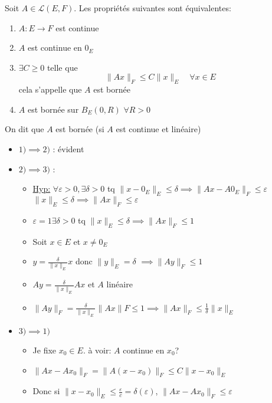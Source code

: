 \begin{theorem}
    Soit $A \in \mathcal{L}(E, F)$. Les propriétés suivantes sont équivalentes:
    \begin{enumerate}
        \item $A: E \to F$ est continue
        \item $A$ est continue en  $0_E$
        \item  $\exists C \ge 0$ telle que 
            \[
            \|Ax\|_F \le C\|x\|_E \quad \forall x \in E
            \] 
            cela s'appelle que $A$ est bornée
        \item $A$ est bornée sur  $B_E(0, R)$ $\forall R > 0$
    \end{enumerate}
    On dit que $A$ est bornée (si $A$ est continue et linéaire)
\end{theorem}
\begin{preuve}
    \begin{itemize}
        \item $1) \implies 2)$ : évident
        \item $2) \implies 3)$ : 
            \begin{itemize}
                \item 
                    \underline{Hyp:} $\forall \varepsilon >0, \exists \delta > 0$ tq $\|x - 0_E\|_E \le \delta \implies \|Ax - A0_E\|_F \le \varepsilon$ $\|x\|_E \le \delta \implies \|Ax\|_F \le \varepsilon$
                \item $\varepsilon = 1 \exists \delta > 0$ tq $\|x\|_E \le \delta \implies \|Ax\|_F \le 1$
                \item Soit $ x \in E$ et $x \neq 0_E$
                \item $y = \frac{\delta}{\|x\|_E}x$ donc $\|y\|_E = \delta$  $\implies\|Ay\|_F \le 1$
                \item $Ay = \frac{\delta}{\|x\|_{E}}Ax$ et $A$ linéaire
                \item  $\|Ay\|_{F} = \frac{\delta}{\|x\|_E}\|Ax\|F \le 1 \implies \|Ax\|_F \le \frac{1}{\delta}\|x\|_E$
            \end{itemize}
        \item $3) \implies 1)$ 
            \begin{itemize}
                \item Je fixe $x_0 \in E$. à voir: $A$ continue en  $x_0$?
                \item $\|Ax - Ax_0\|_F = \|A(x - x_0)\|_F \le C\|x - x_0\|_E$
                \item Donc si $\|x - x_0\|_E \le \frac{\varepsilon}{c} = \delta(\varepsilon)$, $\|Ax - Ax_0\|_F \le \varepsilon$
            \end{itemize}
    \end{itemize}
\end{preuve}

